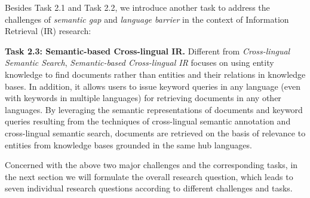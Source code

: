 Besides Task 2.1 and Task 2.2, we introduce another task to address the challenges of \emph{semantic gap} and \emph{language barrier} in the context of Information Retrieval (IR) research:

\noindent  \textbf{Task 2.3: Semantic-based Cross-lingual IR.} 
Different from \emph{Cross-lingual Semantic Search}, \emph{Semantic-based Cross-lingual IR} focuses on using entity knowledge to find documents rather than 
entities 
and their relations in knowledge bases. In addition, it allows users to issue keyword queries in any language (even with keywords in multiple languages) for retrieving documents in any other languages. By leveraging the semantic representations of documents and keyword queries resulting from the techniques of cross-lingual semantic annotation and cross-lingual semantic search, documents are retrieved on the basis of relevance to entities from knowledge bases grounded in the same hub languages.

Concerned with the above two major challenges and the corresponding tasks, in the next section we will formulate the overall research question, which leads to seven individual research questions according to different challenges and tasks.
